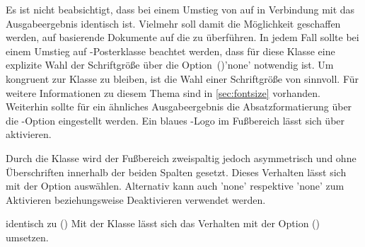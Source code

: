\begin{Bundle*}{}
Es ist nicht beabsichtigt, dass bei einem Umstieg von  auf 
 in Verbindung mit  das Ausgabeergebnis 
identisch ist. Vielmehr soll damit die Möglichkeit geschaffen werden, auf 
 basierende Dokumente auf die  zu 
überführen. In jedem Fall sollte bei einem Umstieg auf \TUDScript-Posterklasse 
beachtet werden, dass für diese Klasse eine explizite Wahl der Schriftgröße 
über die Option~()'none' notwendig ist. 
Um kongruent zur Klasse  zu bleiben, ist die Wahl einer 
Schriftgröße von  sinnvoll. Für weitere 
Informationen zu diesem Thema sind in \autoref{sec:fontsize} vorhanden. 
Weiterhin sollte für ein ähnliches Ausgabeergebnis die Absatzformatierung über 
die \KOMAScript-Option  eingestellt werden. Ein blaues 
\DDC-Logo im Fußbereich lässt sich über  aktivieren.

\begin{Declaration}{}%
\printdeclarationlist%
%
Durch die Klasse  wird der Fußbereich zweispaltig jedoch 
asymmetrisch und ohne Überschriften innerhalb der beiden Spalten gesetzt. 
Dieses Verhalten lässt sich mit der Option  
auswählen. Alternativ kann auch 'none' respektive 
'none' zum Aktivieren beziehungsweise Deaktivieren 
verwendet werden.
\end{Declaration}

\begin{Declaration}{}{%
  identisch zu ()%
}
\printdeclarationlist%
%
Mit der Klasse  lässt sich das Verhalten mit der Option 
() umsetzen.
\end{Declaration}


\end{Bundle*}
